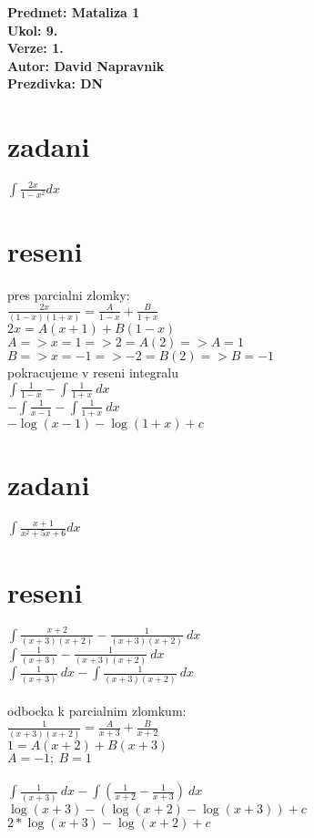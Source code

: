\documentclass[a4paper]{article}
\def\doubleunderline#1{\underline{\underline{#1}}}
\begin{document}
\noindent
\textbf{Predmet: Mataliza 1}\\
\textbf{Ukol: 9.}\\
\textbf{Verze: 1.}\\
\textbf{Autor: David Napravnik}\\
\textbf{Prezdivka: DN}


\section*{zadani}
$\int \frac{2x}{1-x^2} dx$

\section*{reseni}
pres parcialni zlomky:\\
$\frac{2x}{(1-x)(1+x)}=\frac{A}{1-x}+\frac{B}{1+x}$\\
$2x=A(x+1)+B(1-x)$\\
$A=> x=1 => 2=A(2) => A=1$\\
$B=> x=-1 => -2=B(2) => B=-1$\\
pokracujeme v reseni integralu\\
$\int \frac{1}{1-x} - \int \frac{1}{1+x}~dx$\\
$-\int \frac{1}{x-1} - \int \frac{1}{1+x}~dx$\\
$-\log(x-1) - \log(1+x)+c$\\









\section*{zadani}
$\int \frac{x+1}{x^2+5x+6} dx$

\section*{reseni}
$\int \frac{x+2}{(x+3)(x+2)} - \frac{1}{(x+3)(x+2)}~dx$\\
$\int \frac{1}{(x+3)} - \frac{1}{(x+3)(x+2)}~dx$\\
$\int \frac{1}{(x+3)}~dx - \int \frac{1}{(x+3)(x+2)}~dx$\\
\\
odbocka k parcialnim zlomkum:\\
$\frac{1}{(x+3)(x+2)}=\frac{A}{x+3}+\frac{B}{x+2}$\\
$1=A(x+2)+B(x+3)$\\
$A=-1;~B=1$\\
\\
$\int \frac{1}{(x+3)}~dx - \int\left( \frac{1}{x+2}-\frac{1}{x+3}\right)~dx$\\
$\log(x+3) - (\log(x+2)-\log(x+3)) + c$\\
\doubleunderline{$2*\log(x+3) - \log(x+2) + c$}\\
\end{document}
